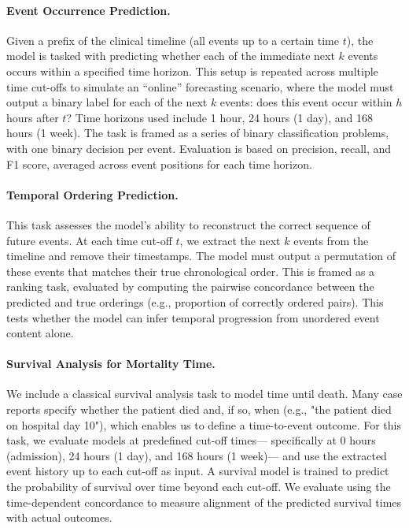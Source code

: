 \documentclass[letterpaper]{article} %
\begin{document}
\paragraph{Event Occurrence Prediction.} 
Given a prefix of the clinical timeline (all events up to a certain time $t$), the model is tasked with predicting whether each of the immediate next $k$ events occurs within a specified time horizon. 
This setup is repeated across multiple time cut-offs to simulate an “online” forecasting scenario, where the model must output a binary label for each of the next $k$ events:
does this event occur within $h$ hours after $t$? 
Time horizons used include 1 hour, 24 hours (1 day), and 168 hours (1 week). 
The task is framed as a series of binary classification problems, with one binary decision per event. 
Evaluation is based on precision, recall, and F1 score, averaged across event positions for each time horizon.

\paragraph{Temporal Ordering Prediction.} 
This task assesses the model's ability to reconstruct the correct sequence of future events. 
At each time cut-off $t$, we extract the next $k$ events from the timeline and remove their timestamps. 
The model must output a permutation of these events that matches their true chronological order.
This is framed as a ranking task, evaluated by computing the pairwise concordance between the predicted and true orderings (e.g., proportion of correctly ordered pairs). 
This tests whether the model can infer temporal progression from unordered event content alone.

\paragraph{Survival Analysis for Mortality Time.}  
We include a classical survival analysis task to model time until death. 
Many case reports specify whether the patient died and, if so, when (e.g., "the patient died on hospital day 10"), which enables us to define a time-to-event outcome. 
For this task, we evaluate models at predefined cut-off times--- specifically at 0 hours (admission), 24 hours (1 day), and 168 hours (1 week)--- and use the extracted event history up to each cut-off as input. 
A survival model is trained to predict the probability of survival over time beyond each cut-off. 
We evaluate using the time-dependent concordance to measure alignment of the predicted survival times with actual outcomes.
\end{document}
